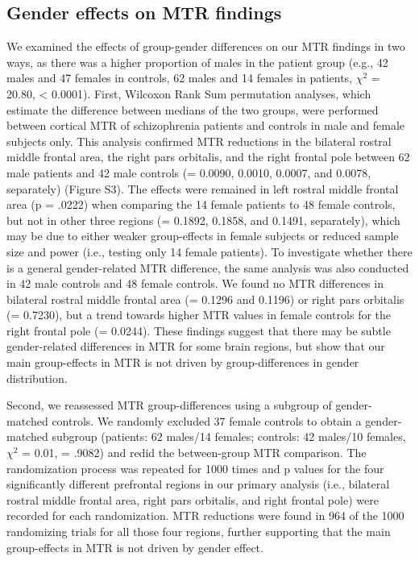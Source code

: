 \begin{refsection}
\subsection*{Gender effects on MTR findings}
We examined the effects of group-gender differences on our MTR findings in two ways, as there was a higher proportion of males in the patient group (e.g., 42 males and 47 females in controls, 62 males and 14 females in patients, $\chi^{2}$ = 20.80, \pval < 0.0001). First, Wilcoxon Rank Sum permutation analyses, which estimate the difference between medians of the two groups, were performed between cortical MTR of schizophrenia patients and controls in male and female subjects only. This analysis confirmed MTR reductions in the bilateral rostral middle frontal area, the right pars orbitalis, and the right frontal pole between 62 male patients and 42 male controls (\pval = 0.0090, 0.0010, 0.0007, and 0.0078, separately) (Figure S3). The effects were remained in left rostral middle frontal area (p = .0222) when comparing the 14 female patients to 48 female controls, but not in other three regions (\pval = 0.1892, 0.1858, and 0.1491, separately), which may be due to either weaker group-effects in female subjects or reduced sample size and power (i.e., testing only 14 female patients). To investigate whether there is a general gender-related MTR difference, the same analysis was also conducted in 42 male controls and 48 female controls. We found no MTR differences in bilateral rostral middle frontal area (\pval = 0.1296 and 0.1196) or right pars orbitalis (\pval = 0.7230), but a trend towards higher MTR values in female controls for the right frontal pole (\pval = 0.0244). These findings suggest that there may be subtle gender-related differences in MTR for some brain regions, but show that our main group-effects in MTR is not driven by group-differences in gender distribution.

Second, we reassessed MTR group-differences using a subgroup of gender-matched controls. We randomly excluded 37 female controls to obtain a gender-matched subgroup (patients: 62 males/14 females; controls: 42 males/10 females, $\chi^{2}$ = 0.01, \pval = .9082) and redid the between-group MTR comparison. The randomization process was repeated for 1000 times and p values for the four significantly different prefrontal regions in our primary analysis (i.e., bilateral rostral middle frontal area, right pars orbitalis, and right frontal pole) were recorded for each randomization. MTR reductions were found in 964 of the 1000 randomizing trials for all those four regions, further supporting that the main group-effects in MTR is not driven by gender effect.


\end{refsection}
